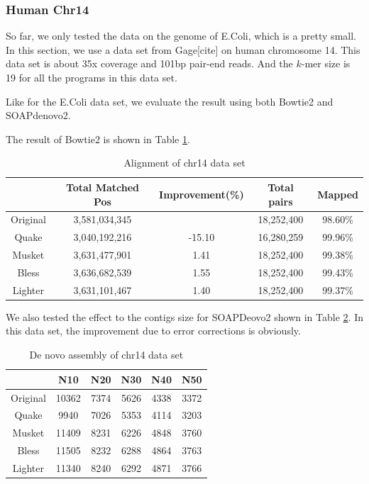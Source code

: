 \documentclass[10pt]{article}
\begin{document}
\subsubsection*{Human Chr14}
So far, we only tested the data on the genome of E.Coli, which is a pretty small. In this section, we use a data set from Gage[cite] on human chromosome 14. This data set is about 35x coverage and 101bp pair-end reads. And the $k$-mer size is 19 for all the programs in this data set.

Like for the E.Coli data set, we evaluate the result using both Bowtie2 and SOAPdenovo2.

The result of Bowtie2 is shown in Table \ref{table:chr14_bowtie2}.

\begin{table}
\begin{tabular}{|c|c|c|c|c|}\hline
  & Total Matched Pos & Improvement(\%) & Total pairs & Mapped \\ \hline
Original &	3,581,034,345	&	& 18,252,400 & 98.60\% \\ \hline
Quake	& 3,040,192,216	& -15.10 &	16,280,259 &	99.96\% \\ \hline
Musket	& 3,631,477,901	& 1.41	& 18,252,400	& 99.38\% \\ \hline
Bless	& 3,636,682,539	& 1.55	& 18,252,400	& 99.43\% \\ \hline
Lighter	& 3,631,101,467	& 1.40	& 18,252,400	& 99.37\% \\ \hline
\end{tabular}
\caption{Alignment of chr14 data set\label{table:chr14_bowtie2}}
\end{table}

We also tested the effect to the contigs size for SOAPDeovo2 shown in Table \ref{table:chr14_sd2}. In this data set, the improvement due to error corrections is obviously. 

\begin{table}
\begin{tabular}{|c|c|c|c|c|c|} \hline
 		& N10 & N20 & N30 & N40 & N50 \\ \hline
Original	&			10362	& 7374	& 5626	& 4338	& 3372 \\ \hline
Quake		&		9940	& 7026	& 5353	& 4114	&3203 \\ \hline
Musket		&		11409	& 8231	& 6226	& 4848	&3760 \\ \hline
Bless		&		11505	& 8232	& 6288	& 4864	&3763 \\ \hline
Lighter		&		11340	& 8240	& 6292	& 4871	&3766 \\ \hline
\end{tabular}
\caption{De novo assembly of chr14 data set\label{table:chr14_sd2}}
\end{table}
\end{document}
